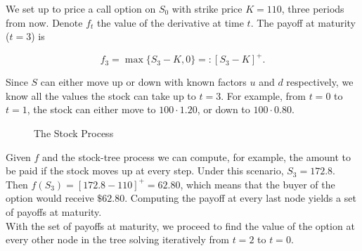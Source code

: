 \documentclass[../TGMAFFIRO.tex]{subfiles}
\begin{document}
We set up to price a call option on $S_0$ with strike price $K=110$, three periods from now. Denote $f_t$ the value of the derivative at time $t$. The payoff at maturity ($t=3$) is

\begin{equation}
    f_3 = \max\{S_3 - K, 0\} =: [S_3 - K]^+.
\end{equation}

Since $S$ can either move up or down with known factors $u$ and $d$ respectively, we know all the values the stock can take up to $t=3$. For example, from $t=0$ to $t=1$, the stock can either move to $100 \cdot 1.20$, or down to $100 \cdot 0.80$.\\

\begin{figure}
\centering
{}
\caption{The Stock Process}
\end{figure}

Given $f$ and the stock-tree process we can compute, for example, the amount to be paid if the stock moves up at every step. Under this scenario, $S_3 = 172.8$. Then $f(S_3) = [172.8 - 110]^+ = 62.80$, which means that the buyer of the option would receive $\$62.80$. Computing the payoff at every last node yields a set of payoffs at maturity.\\

With the set of payoffs at maturity, we proceed to find the value of the option at every other node in the tree solving iteratively from $t=2$ to $t=0$.\\
\end{document}
